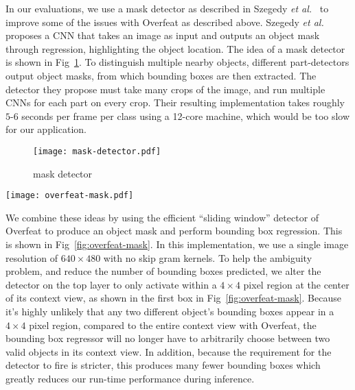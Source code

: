\documentclass[journal]{IEEEtran}
\begin{document}
In our evaluations, we use a mask detector as described in Szegedy \textit{et al.}~\cite{szegedy-2013} to improve some of the issues with Overfeat as described above. Szegedy \textit{et al.} proposes a CNN that takes an image as input and outputs an object mask through regression, highlighting the object location. The idea of a mask detector is shown in Fig~\ref{fig:mask-detector}. To distinguish multiple nearby objects, different part-detectors output object masks, from which bounding boxes are then extracted. The detector they propose must take many crops of the image, and run multiple CNNs for each part on every crop. Their resulting implementation takes roughly $5$-$6$ seconds per frame per class using a 12-core machine, which would be too slow for our application. 

\begin{figure}[tb]
  \centering
    \texttt{[image: mask-detector.pdf]}
 \caption{mask detector}
 \label{fig:mask-detector}
\end{figure}


\begin{figure*}[tb]
  \centering
    \texttt{[image: overfeat-mask.pdf]}
 \caption{overfeat-mask}
 \label{fig:overfeat-mask}
\end{figure*}

We combine these ideas by using the efficient ``sliding window'' detector of Overfeat to produce an object mask and perform bounding box regression. This is shown in Fig~\ref{fig:overfeat-mask}. In this implementation, we use a single image resolution of $640 \times 480$ with no skip gram kernels. To help the ambiguity problem, and reduce the number of bounding boxes predicted, we alter the detector on the top layer to only activate within a $4 \times 4$ pixel region at the center of its context view, as shown in the first box in Fig~\ref{fig:overfeat-mask}. Because it's highly unlikely that any two different object's bounding boxes appear in a $4 \times 4$ pixel region, compared to the entire context view with Overfeat, the bounding box regressor will no longer have to arbitrarily choose between two valid objects in its context view. In addition, because the requirement for the detector to fire is stricter, this produces many fewer bounding boxes which greatly reduces our run-time performance during inference. 
\end{document}
